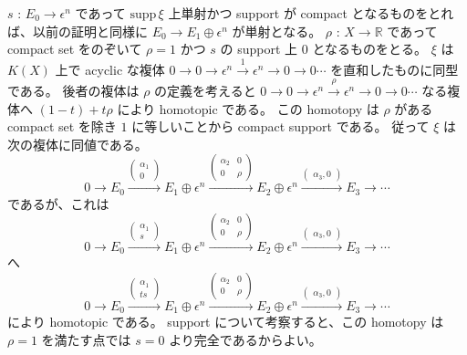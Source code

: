 \documentclass[dvipdfmx]{jsarticle}
\begin{document}
\begin{Proof}[(3)]
\itemprof
  \(s\) : \(E_0 \to \epsilon^n\) であって \(\text{supp} \, \xi\) 上単射かつ support が compact となるものをとれば、以前の証明と同様に \(E_0 \to E_1 \oplus \epsilon^n\) が単射となる。
  \(\rho\) : \(X \to \mathbb{R}\) であって compact set をのぞいて \(\rho = 1\) かつ \(s\) の support 上 \(0\) となるものをとる。
  \(\xi\) は \(K(X)\) 上で acyclic な複体 \(0 \to 0 \to \epsilon^n \overset{1}{\to} \epsilon^n \to 0 \to 0 \cdots\) を直和したものに同型である。
  後者の複体は \(\rho\) の定義を考えると \(0 \to 0 \to \epsilon^n \overset{\rho}{\to} \epsilon^n \to 0 \to 0 \cdots\) なる複体へ \((1 - t) + t \rho\) により homotopic である。
  この homotopy は \(\rho\) がある compact set を除き \(1\) に等しいことから compact support である。
  従って \(\xi\) は次の複体に同値である。
  \[0 \to E_0 \overset{
    \begin{pmatrix}
      \alpha_1 \\
      0
    \end{pmatrix}
  }{\to} E_1 \oplus \epsilon^n \overset{
    \begin{pmatrix}
      \alpha_2 & 0 \\
      0 & \rho
    \end{pmatrix}
  }{\to} E_2 \oplus \epsilon^n \overset{
    \begin{pmatrix}
      \alpha_3 , 0
    \end{pmatrix}
  }{\to} E_3 \to \cdots\]
  であるが、これは
  \[0 \to E_0 \overset{
    \begin{pmatrix}
      \alpha_1 \\
      s
    \end{pmatrix}
  }{\to} E_1 \oplus \epsilon^n \overset{
    \begin{pmatrix}
      \alpha_2 & 0 \\
      0 & \rho
    \end{pmatrix}
  }{\to} E_2 \oplus \epsilon^n \overset{
    \begin{pmatrix}
      \alpha_3 , 0
    \end{pmatrix}
  }{\to} E_3 \to \cdots\]
  へ
  \[0 \to E_0 \overset{
    \begin{pmatrix}
      \alpha_1 \\
      t s
    \end{pmatrix}
  }{\to} E_1 \oplus \epsilon^n \overset{
    \begin{pmatrix}
      \alpha_2 & 0 \\
      0 & \rho
    \end{pmatrix}
  }{\to} E_2 \oplus \epsilon^n \overset{
    \begin{pmatrix}
      \alpha_3 , 0
    \end{pmatrix}
  }{\to} E_3 \to \cdots\]
  により homotopic である。
  support について考察すると、この homotopy は \(\rho = 1\) を満たす点では \(s = 0\) より完全であるからよい。
\end{Proof}
\end{document}
